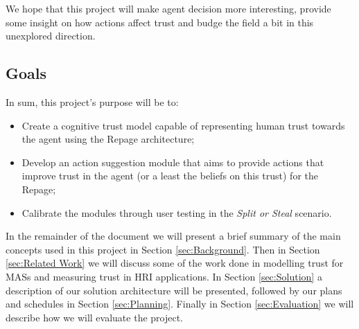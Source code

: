We hope that this project will make agent decision more interesting, provide some insight on how actions affect trust and budge the field a bit in this unexplored direction.


\subsection{Goals}
\label{subsec:Goals}

In sum, this project's purpose will be to:
\begin{itemize}
	\item Create a cognitive trust model capable of representing human trust towards the agent using the Repage architecture;
	\item Develop an action suggestion module that aims to provide actions that improve trust in the agent (or a least the beliefs on this trust) for the Repage;
	\item Calibrate the modules through user testing in the \textit{Split or Steal} scenario.
\end{itemize}


In the remainder of the document we will present a brief summary of the main concepts used in this project in Section \ref{sec:Background}. Then in Section \ref{sec:Related Work} we will discuss some of the work done in modelling trust for \acp{MAS} and measuring trust in \ac{HRI} applications. In Section \ref{sec:Solution} a description of our solution architecture will be presented, followed by our plans and schedules in Section \ref{sec:Planning}. Finally in Section \ref{sec:Evaluation} we will describe how we will evaluate the project.


